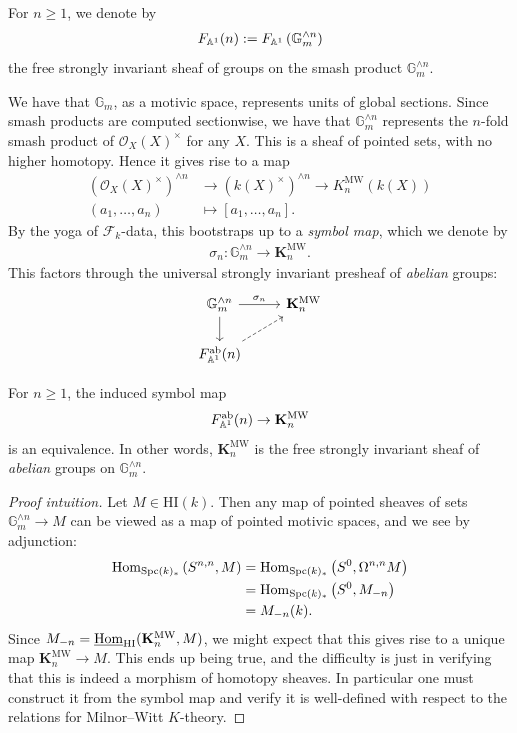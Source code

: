 \documentclass[11pt,openany]{book}
\providecommand{\HI}{\mathrm{HI}}
\providecommand{\MW}{\mathrm{MW}}
\let\smashprod\wedge
\providecommand{\KMW}{\mathbf{K}^\mathrm{MW}}
\begin{document}
\begin{notation} For $n\ge 1$, we denote by
\begin{align*}
    F_{\A^1}(n) := F_{\A^1} \left( \mathbb{G}_m^{\smashprod n} \right)
\end{align*}
the free strongly invariant sheaf of groups on the smash product $\mathbb{G}_m^{\smashprod n}$.
\end{notation}

We have that $\mathbb{G}_m$, as a motivic space, represents units of global sections. Since smash products are computed sectionwise, we have that $\mathbb{G}_m^{\smashprod n}$ represents the $n$-fold smash product of $\mathcal{O}_X(X)^\times$ for any $X$. This is a sheaf of pointed sets, with no higher homotopy. Hence it gives rise to a map
\begin{align*}
    \left( \mathcal{O}_X(X)^\times \right)^{\smashprod n} &\to (k(X)^\times)^{\smashprod n} \to K_n^\MW(k(X)) \\
    (a_1, \ldots, a_n) &\mapsto \left[ a_1, \ldots, a_n \right].
\end{align*}
By the yoga of $\mathcal{F}_k$-data, this bootstraps up to a \textit{symbol map}, which we denote by
\begin{align*}
    \sigma_n \colon \mathbb{G}_m^{\smashprod n} \to \KMW_n.
\end{align*}
%
This factors through the universal strongly invariant presheaf of \textit{abelian} groups:
\[ \begin{tikzcd}
    \mathbb{G}_m^{\smashprod n}\rar["\sigma_n"]\dar & \KMW_n\\
    F_{\A^1}^\ab(n)\ar[ur,dashed] &
\end{tikzcd} \]

\begin{theorem} \cite[3.37]{Morel} For $n\ge 1$, the induced symbol map
\begin{align*}
    F_{\A^1}^\ab(n) \to \KMW_n
\end{align*}
is an equivalence. In other words, $\KMW_n$ is the free strongly invariant sheaf of \textit{abelian} groups on $\mathbb{G}_m^{\smashprod  n}$.
\end{theorem}
\begin{proof}[Proof intuition] Let $M \in \HI(k)$. Then any map of pointed sheaves of sets $\mathbb{G}_m^{\smashprod n} \to M$ can be viewed as a map of pointed motivic spaces, and we see by adjunction:
\begin{align*}
    \mathrm{Hom}_{\mathrm{Spc}(k)_\ast} \left( S^{n,n}, M \right) &= \mathrm{Hom}_{\mathrm{Spc}(k)_\ast} \left( S^0, \Omega^{n,n} M \right) \\
    &= \mathrm{Hom}_{\mathrm{Spc}(k)_\ast} \left( S^0, M_{-n} \right) \\
    &= M_{-n}(k).
\end{align*}
Since $M_{-n} = \underline{\Hom}_{\HI}(\KMW_n, M)$, we might expect that this gives rise to a unique map $\KMW_n \to M$. This ends up being true, and the difficulty is just in verifying that this is indeed a morphism of homotopy sheaves. In particular one must construct it from the symbol map and verify it is well-defined with respect to the relations for Milnor--Witt $K$-theory.
\end{proof}
\end{document}
